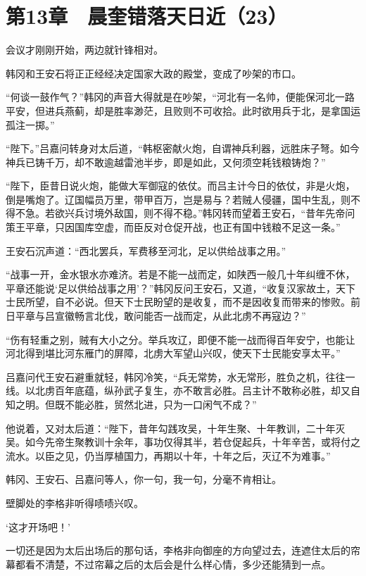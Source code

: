 \section{第13章　晨奎错落天日近（23）}

会议才刚刚开始，两边就针锋相对。

韩冈和王安石将正正经经决定国家大政的殿堂，变成了吵架的市口。

“何谈一鼓作气？”韩冈的声音大得就是在吵架，“河北有一名帅，便能保河北一路平安，但进兵燕蓟，却是胜率渺茫，且败则不可收拾。此时欲用兵于北，是拿国运孤注一掷。”

“陛下。”吕嘉问转身对太后道，“韩枢密献火炮，自谓神兵利器，远胜床子弩。如今神兵已铸千万，却不敢逾越雷池半步，即是如此，又何须空耗钱粮铸炮？”

“陛下，臣昔日说火炮，能做大军御寇的依仗。而吕主计今日的依仗，非是火炮，倒是嘴炮了。辽国幅员万里，带甲百万，岂是易与？若贼人侵疆，国中生乱，则不得不急。若欲兴兵讨境外敌国，则不得不稳。”韩冈转而望着王安石，“昔年先帝问策王平章，只因国库空虚，而臣反对仓促开战，也正有国中钱粮不足这一条。”

王安石沉声道：“西北罢兵，军费移至河北，足以供给战事之用。”

“战事一开，金水银水亦难济。若是不能一战而定，如陕西一般几十年纠缠不休，平章还能说‘足以供给战事之用’？”韩冈反问王安石，又道，“收复汉家故土，天下士民所望，自不必说。但天下士民盼望的是收复，而不是因收复而带来的惨败。前日平章与吕宣徽畅言北伐，敢问能否一战而定，从此北虏不再寇边？”

“伤有轻重之别，贼有大小之分。举兵攻辽，即便不能一战而得百年安宁，也能让河北得到堪比河东雁门的屏障，北虏大军望山兴叹，使天下士民能安享太平。”

吕嘉问代王安石避重就轻，韩冈冷笑，“兵无常势，水无常形，胜负之机，往往一线。以北虏百年底蕴，纵孙武子复生，亦不敢言必胜。吕主计不敢称必胜，却又自知之明。但既不能必胜，贸然北进，只为一口闲气不成？”

他说着，又对太后道：“陛下，昔年勾践攻吴，十年生聚、十年教训，二十年灭吴。如今先帝生聚教训十余年，事功仅得其半，若仓促起兵，十年辛苦，或将付之流水。以臣之见，仍当厚植国力，再期以十年，十年之后，灭辽不为难事。”

韩冈、王安石、吕嘉问等人，你一句，我一句，分毫不肯相让。

壁脚处的李格非听得啧啧兴叹。

‘这才开场吧！’

一切还是因为太后出场后的那句话，李格非向御座的方向望过去，连遮住太后的帘幕都看不清楚，不过帘幕之后的太后会是什么样心情，多少还能猜到一点。

